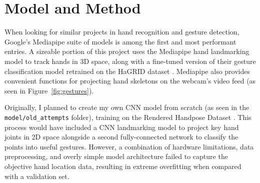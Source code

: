 \documentclass{article}
\begin{document}
\section{Model and Method}
When looking for similar projects in hand recognition and gesture detection, Google's Mediapipe suite of models \cite{gesture_recognizer} is among the first and most performant entries. A sizeable portion of this project uses the Mediapipe hand landmarking model to track hands in 3D space, along with a fine-tuned version of their gesture classification model retrained on the HaGRID dataset \cite{Alexander_2024}. Mediapipe also provides convenient functions for projecting hand skeletons on the webcam's video feed (as seen in Figure~\ref{fig:gestures}).

Originally, I planned to create my own CNN model from scratch (as seen in the \texttt{model/old\_attempts} folder), training on the Rendered Handpose Dataset \cite{zimmermann2017learningestimate3dhand}. This process would have included a CNN landmarking model to project key hand joints in 2D space alongside a second fully-connected network to classify the points into useful gestures. However, a combination of hardware limitations, data preprocessing, and overly simple model architecture failed to capture the objective hand location data, resulting in extreme overfitting when compared with a validation set.
\end{document}
